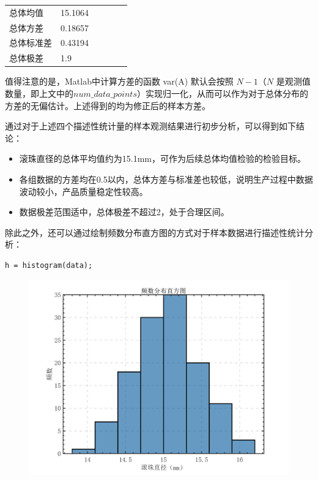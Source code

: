 \documentclass[12pt]{article}  %
\begin{document}
\begin{longtable}[]{@{}llllll@{}}
	\midrule\noalign{}
	\endhead
	\bottomrule\noalign{}
	\endlastfoot

	总体均值 & 15.1064 \\
	总体方差 & 0.18657\\
	总体标准差 & 0.43194\\
	总体极差 & 1.9\\
\end{longtable}

值得注意的是，Matlab中计算方差的函数 var(A) 默认会按照 $N-1$（$N$ 是观测值数量，即上文中的$num\_data\_points$）实现归一化，从而可以作为对于总体分布的方差的无偏估计。上述得到的均为修正后的样本方差。

通过对于上述四个描述性统计量的样本观测结果进行初步分析，可以得到如下结论：
\begin{itemize}
	\setlength{\parsep}{0ex} %
	\setlength{\topsep}{2ex} %
	\setlength{\itemsep}{1ex} %
	\item 滚珠直径的总体平均值约为15.1mm，可作为后续总体均值检验的检验目标。		
	\item 各组数据的方差均在0.5以内，总体方差与标准差也较低，说明生产过程中数据波动较小，产品质量稳定性较高。
	\item 数据极差范围适中，总体极差不超过2，处于合理区间。
\end{itemize}

除此之外，还可以通过绘制频数分布直方图的方式对于样本数据进行描述性统计分析：
\begin{lstlisting}
h = histogram(data);
\end{lstlisting}

\begin{figure}[H]
	\centering
	\includegraphics[width=1\textwidth]{1.png}
\end{figure}
\end{document}
